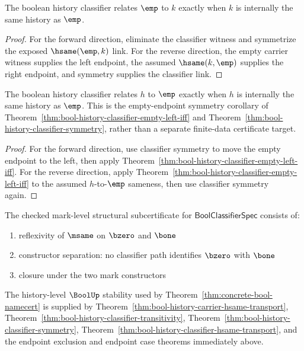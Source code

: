 \begin{theorem}
\label{thm:bool-history-classifier-empty-left-iff}
The boolean history classifier relates \(\emp\) to \(k\) exactly when \(k\)
is internally the same history as \(\emp\).
\end{theorem}
\begin{proof}
For the forward direction, eliminate the classifier witness and symmetrize the
exposed \(\hsame(\emp,k)\) link. For the reverse direction, the empty carrier
witness supplies the left endpoint, the assumed \(\hsame(k,\emp)\) supplies the
right endpoint, and symmetry supplies the classifier link.
\end{proof}

\begin{corollary}
\label{thm:bool-history-classifier-empty-right-iff}
The boolean history classifier relates $h$ to $\emp$ exactly when $h$ is
internally the same history as $\emp$.
This is the empty-endpoint symmetry corollary of
Theorem~\ref{thm:bool-history-classifier-empty-left-iff} and
Theorem~\ref{thm:bool-history-classifier-symmetry}, rather than a separate
finite-data certificate target.
\end{corollary}
\begin{proof}
For the forward direction, use classifier symmetry to move the empty endpoint
to the left, then apply Theorem~\ref{thm:bool-history-classifier-empty-left-iff}.
For the reverse direction, apply Theorem~\ref{thm:bool-history-classifier-empty-left-iff}
to the assumed $h$-to-$\emp$ sameness, then use classifier symmetry again.
\end{proof}

\begin{definition}
\label{def:bool-stability-certificate}
The checked mark-level structural subcertificate for $\mathsf{BoolClassifierSpec}$ consists of:
\begin{enumerate}
  \item reflexivity of $\msame$ on $\bzero$ and $\bone$
  \item constructor separation: no classifier path identifies $\bzero$ with $\bone$
  \item closure under the two mark constructors
\end{enumerate}

The history-level $\BoolUp$ stability used by Theorem~\ref{thm:concrete-bool-namecert} is supplied by Theorem~\ref{thm:bool-history-carrier-hsame-transport}, Theorem~\ref{thm:bool-history-classifier-transitivity}, Theorem~\ref{thm:bool-history-classifier-symmetry}, Theorem~\ref{thm:bool-history-classifier-hsame-transport}, and the endpoint exclusion and endpoint case theorems immediately above.
\end{definition}

